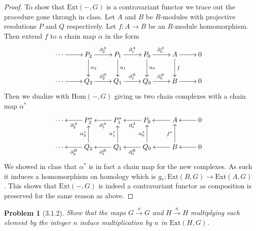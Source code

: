 \documentclass[10pt]{article}
\newcommand{\sk}{\vskip 10mm}
\newcommand{\Ext}{\mathrm{Ext}}
\newcommand{\Hom}{\mathrm{Hom}}
\theoremstyle{plain}
\newtheorem{problem}{Problem}
\theoremstyle{remark}
\begin{document}
\begin{proof}
  To show that $\Ext(-,G)$ is a contravariant functor we trace out the
  procedure gone through in class. Let $A$ and $B$ be $R$-modules with
  projective resolutions $P$ and $Q$ respectively. Let $f:A\rightarrow B$ be an
  $R$-module homomorphism. Then extend $f$ to a chain map $\alpha$ in the form
  \[
    \xymatrix{
      \cdots \ar[r] & P_2 \ar[r]^{\partial^A_2} \ar[d]^{\alpha_2}& P_1 \ar[r]^{\partial^A_1} \ar[d]^{\alpha_1}& P_0 \ar[r]^{\partial^A_0} \ar[d]^{\alpha_0}& A \ar[r] \ar[d]^f & 0\\
      \cdots \ar[r] & Q_2 \ar[r]^{\partial^B_2}& Q_1 \ar[r]^{\partial^B_1} & Q_0 \ar[r]^{\partial^B_0} & B \ar[r] & 0\\
    }
  \]
  Then we dualize with $\Hom(-,G)$ giving us two chain complexes with a chain
  map $\alpha^*$
  \[
    \xymatrix{
      \cdots  & P_2^* \ar[l]^{\partial^A_2} & P_1^* \ar[l]^{\partial^A_1}& P_0 \ar[l]^{\partial^A_0} & A \ar[l]  & \ar[l]0\\
      \cdots  & Q_2 \ar[l]^{\partial^B_2}\ar[u]^{\alpha_2^*} & Q_1 \ar[u]^{\alpha_1^*} \ar[l]^{\partial^B_1} & Q_0 \ar[u]^{\alpha_0^*} \ar[l]^{\partial^B_0} & B \ar[u]^{f^*}\ar[l] & \ar[l]0\\
    }
  \]
  We showed in class that $\alpha^*$ is in fact a chain map for the new complexes. As
  such it induces a homomorphism on homology which is 
  $g_*:\Ext(B,G)\rightarrow\Ext(A,G)$. This shows that $\Ext(-,G)$ is indeed a contravariant
  functor as composition is preserved for the same reason as above.
\end{proof}

\sk

\begin{problem}[3.1.2]
  Show that the maps $G\xrightarrow{n} G$ and $H\xrightarrow{n} H$ multiplying
  each element by the integer $n$ induce multiplication by $n$ in $\Ext(H,G)$.
\end{problem}
\end{document}
